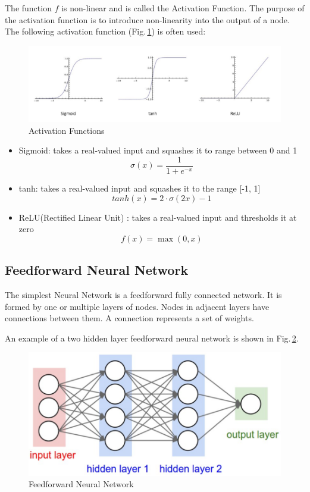 The function $f$ is non-linear and is called the Activation Function. The purpose of the activation function is to introduce non-linearity into the output of a node. The following activation function (Fig.\,\ref{activation}) is often used:
\begin{figure}
	\centering
	\includegraphics[scale=0.5]{Figs/activation.png}
    \caption{Activation Functions}
    \label{activation}
\end{figure}

\begin{itemize}
  \item Sigmoid: takes a real-valued input and squashes it to range between 0 and 1
        $$ \sigma(x) =  \frac{\mathrm{1} }{\mathrm{1} + e^{-x} }  $$ 
  \item tanh: takes a real-valued input and squashes it to the range [-1, 1]
        $$ tanh(x) = 2\cdot\sigma(2x)-1 $$
        
  \item ReLU(Rectified Linear Unit) \citep{Nair:2010:RLU:3104322.3104425}: takes a real-valued input and thresholds it at zero
        $$f(x) = \max(0,x)$$
\end{itemize}

\subsection{Feedforward Neural Network}

The simplest Neural Network is a feedforward fully connected network. It is formed by one or multiple layers of nodes. Nodes in adjacent layers have connections between them. A connection represents a set of weights.


\noindent An example of a two hidden layer feedforward neural network is shown in Fig.\,\ref{two_layer}.

\begin{figure}[h]
	\centering
	\includegraphics[scale=0.5]{Figs/2hidden.png}
    \caption{Feedforward Neural Network}
    \label{two_layer}
\end{figure}

